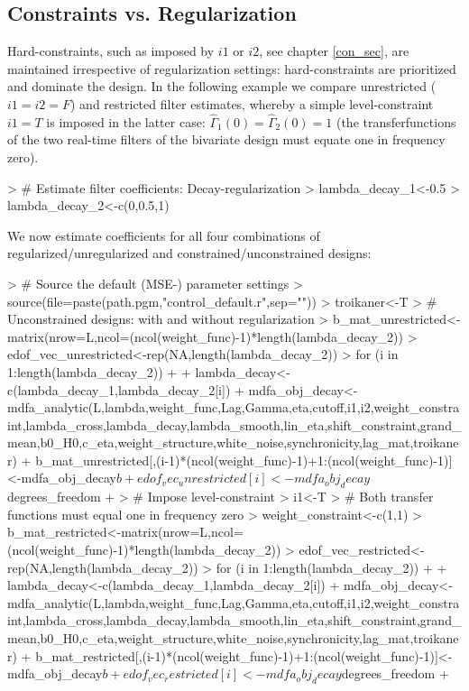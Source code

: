 \documentclass[a4paper]{book}
\begin{document}
\subsection{Constraints vs. Regularization}\label{con_vs_reg}


Hard-constraints, such as imposed by $i1$ or $i2$, see chapter \ref{con_sec}, are maintained irrespective of regularization settings: hard-constraints are prioritized and dominate the design. In the following example we compare unrestricted ($i1=i2=F$) and restricted filter estimates, whereby a simple level-constraint $i1=T$ is imposed in the latter case: $\hat{\Gamma}_1(0)=\hat{\Gamma}_2(0)=1$ (the transferfunctions of the two real-time filters of the bivariate design must equate one in frequency zero).


\begin{Schunk}
\begin{Sinput}
> # Estimate filter coefficients: Decay-regularization
> lambda_decay_1<-0.5
> lambda_decay_2<-c(0,0.5,1)
\end{Sinput}
\end{Schunk}
We now estimate coefficients for all four combinations of regularized/unregularized and constrained/unconstrained designs:
\begin{Schunk}
\begin{Sinput}
> # Source the default (MSE-) parameter settings
> source(file=paste(path.pgm,"control_default.r",sep=""))
> troikaner<-T
> # Unconstrained designs: with and without regularization
> b_mat_unrestricted<-matrix(nrow=L,ncol=(ncol(weight_func)-1)*length(lambda_decay_2))
> edof_vec_unrestricted<-rep(NA,length(lambda_decay_2))
> for (i in 1:length(lambda_decay_2))
+ {
+   lambda_decay<-c(lambda_decay_1,lambda_decay_2[i])
+   mdfa_obj_decay<-mdfa_analytic(L,lambda,weight_func,Lag,Gamma,eta,cutoff,i1,i2,weight_constraint,lambda_cross,lambda_decay,lambda_smooth,lin_eta,shift_constraint,grand_mean,b0_H0,c_eta,weight_structure,white_noise,synchronicity,lag_mat,troikaner)
+   b_mat_unrestricted[,(i-1)*(ncol(weight_func)-1)+1:(ncol(weight_func)-1)]<-mdfa_obj_decay$b
+   edof_vec_unrestricted[i]<-mdfa_obj_decay$degrees_freedom
+ }
> # Impose level-constraint
> i1<-T
> # Both transfer functions must equal one in frequency zero
> weight_constraint<-c(1,1)
> b_mat_restricted<-matrix(nrow=L,ncol=(ncol(weight_func)-1)*length(lambda_decay_2))
> edof_vec_restricted<-rep(NA,length(lambda_decay_2))
> for (i in 1:length(lambda_decay_2))
+ {
+   lambda_decay<-c(lambda_decay_1,lambda_decay_2[i])
+   mdfa_obj_decay<-mdfa_analytic(L,lambda,weight_func,Lag,Gamma,eta,cutoff,i1,i2,weight_constraint,lambda_cross,lambda_decay,lambda_smooth,lin_eta,shift_constraint,grand_mean,b0_H0,c_eta,weight_structure,white_noise,synchronicity,lag_mat,troikaner)
+   b_mat_restricted[,(i-1)*(ncol(weight_func)-1)+1:(ncol(weight_func)-1)]<-mdfa_obj_decay$b
+   edof_vec_restricted[i]<-mdfa_obj_decay$degrees_freedom
+ }
\end{Sinput}
\end{Schunk}
\end{document}
